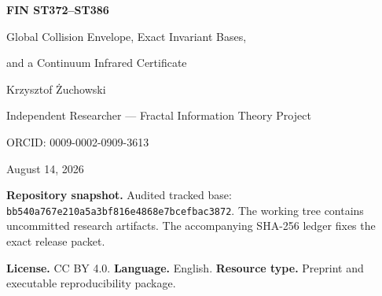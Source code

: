 \documentclass[11pt,a4paper]{article}
\begin{document}
\hypersetup{pageanchor=false}
\begin{titlepage}\centering
\vspace*{1cm}{\Large Fractal Information Theory Project\par}\vspace{.8cm}
{\huge\bfseries FIN ST372--ST386\par}\vspace{.35cm}
{\LARGE Global Collision Envelope, Exact Invariant Bases,\par}
{\LARGE and a Continuum Infrared Certificate\par}
\vspace{.85cm}{\large Local analytical, interval, exact finite, and bounded numerical research\par}
\vfill{\Large Krzysztof \hspace{.04em}\.{Z}uchowski\par}\vspace{.2cm}
{\large Independent Researcher --- Fractal Information Theory Project\par}
{\large ORCID: 0009-0002-0909-3613\par}\vspace{.7cm}
{\large August 14, 2026\par}\vspace{.2cm}{\large Release 10.82\par}\vfill
\begin{minipage}{.92\textwidth}\small
\textbf{Repository snapshot.} Audited tracked base:
\texttt{bb540a767e210a5a3bf816e4868e7bcefbac3872}. The working tree contains
uncommitted research artifacts. The accompanying SHA-256 ledger fixes the exact release packet.

\medskip\textbf{License.} CC BY 4.0. \quad \textbf{Language.} English. \quad
\textbf{Resource type.} Preprint and executable reproducibility package.
\end{minipage}\end{titlepage}
\hypersetup{pageanchor=true}
\end{document}
